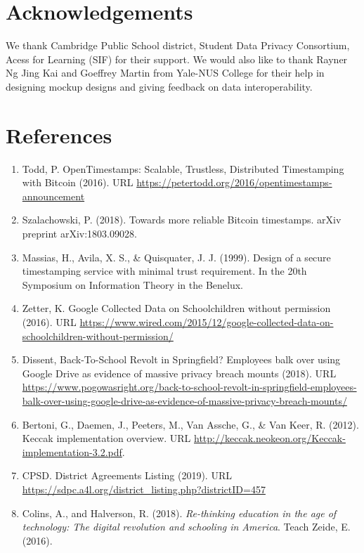 \documentclass{article}
\begin{document}
\section{Acknowledgements}
We thank Cambridge Public School district, Student Data Privacy Consortium, Acess for Learning (SIF) for their support. We would also like to thank Rayner Ng Jing Kai and Goeffrey Martin from Yale-NUS College for their help in designing mockup designs and giving feedback on data interoperability.

\section{References}
\begin{enumerate}
    \label{sec:1}
    \item Todd, P. OpenTimestamps: Scalable, Trustless, Distributed Timestamping with Bitcoin (2016). URL \url{https://petertodd.org/2016/opentimestamps-announcement}
    \label{sec:2}
    \item Szalachowski, P. (2018). Towards more reliable Bitcoin timestamps. arXiv preprint arXiv:1803.09028.
    \label{sec:3}
    \item Massias, H., Avila, X. S., \& Quisquater, J. J. (1999). Design of a secure timestamping service with minimal trust requirement. In the 20th Symposium on Information Theory in the Benelux.
    \label{sec:4}
    \item Zetter, K. Google Collected Data on Schoolchildren without permission (2016). URL \url{https://www.wired.com/2015/12/google-collected-data-on-schoolchildren-without-permission/}
    \label{sec:5}
    \item Dissent, Back-To-School Revolt in Springfield? Employees balk over using Google Drive as evidence of massive privacy breach mounts (2018).  URL \url{https://www.pogowasright.org/back-to-school-revolt-in-springfield-employees-balk-over-using-google-drive-as-evidence-of-massive-privacy-breach-mounts/}
    \label{sec:6}
    \item Bertoni, G., Daemen, J., Peeters, M., Van Assche, G., \& Van Keer, R. (2012). Keccak implementation overview. URL  \url{http://keccak.neokeon.org/Keccak-implementation-3.2.pdf}.
    \label{sec:7}
    \item CPSD. District Agreements Listing (2019). URL  \url{https://sdpc.a4l.org/district_listing.php?districtID=457}
    \label{sec:8}
    \item Colins, A., and Halverson, R. (2018).\textit{ Re-thinking education in the age of technology: The digital revolution and schooling in America}. Teach Zeide, E. (2016).

\end{enumerate}
\end{document}
